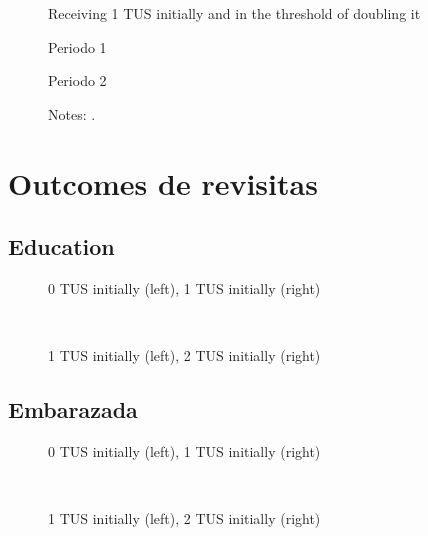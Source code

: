 \documentclass[12pt]{article}
\begin{document}
\begin{figure}[H]%
	\caption{Receiving 1 TUS initially and in the threshold of doubling it}%
	\centering
	\caption*{ {Periodo 1}}
	\qquad
	\caption*{Periodo 2}
	\label{fig:pp2013_seg_2TUS}%
	\caption*{ {\footnotesize Notes: .}}
\end{figure}

\section{Outcomes de revisitas}

\subsection{Education}
\begin{figure}[H]%
	\centering
	\caption*{0 TUS initially (left), 1 TUS initially (right)}
	 \quad 
	 \\
	
	\caption*{1 TUS initially (left), 2 TUS initially (right)}
	 \qquad
	\label{fig:asisteEscuelaTwo}%
\end{figure}

\subsection{Embarazada}
\begin{figure}[H]%
	\centering
	\caption*{0 TUS initially (left), 1 TUS initially (right)}
	 \quad 
	 \\
	
	\caption*{1 TUS initially (left), 2 TUS initially (right)}
	 \qquad
	\label{fig:embarazadaTwo}%
\end{figure}
\end{document}
